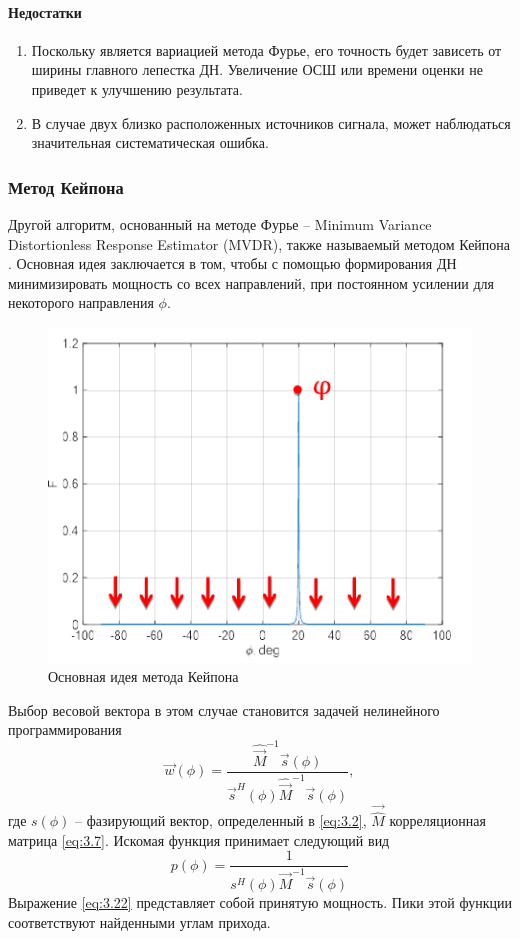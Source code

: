 \paragraph{Недостатки}%
\label{par:nedostatki}
\begin{enumerate}
    \item Поскольку является вариацией метода Фурье, его точность будет зависеть 
    от ширины главного лепестка ДН. Увеличение ОСШ или времени оценки не приведет к улучшению результата. 
    \item В случае двух близко расположенных источников сигнала, может наблюдаться значительная систематическая ошибка. 
\end{enumerate}

\subsubsection{Метод Кейпона}%
\label{sub:minimum_variance_distortionless_response_estimator_capon_method_}

Другой алгоритм, основанный на методе Фурье -- Minimum Variance
Distortionless Response Estimator (MVDR), также называемый методом Кейпона \cite{Stoica2005,Allen2006, Godara2004}. 
Основная идея заключается в том, чтобы с помощью формирования ДН 
минимизировать мощность со всех направлений, при постоянном усилении для некоторого направления $\phi$.

\begin{figure}[h]
    \centering
    \includegraphics[width=0.6\linewidth]{figs/fig3.15.png}
    \caption{Основная идея метода Кейпона}
    \label{fig:3.15}
\end{figure}
Выбор весовой вектора в этом случае становится задачей нелинейного программирования 
\cite{Stoica2005, Godara2004}
\begin{equation}
    \label{eq:3.21}
    \vec w(\phi) = \frac{\hat{\vec M}^{-1} \vec s (\phi)}{\vec s^H(\phi)
        \hat{\vec M}^{-1} \vec s(\phi)},
\end{equation}
где $s(\phi)$ -- фазирующий вектор, определенный в \eqref{eq:3.2}, $\vec{\hat M}$ корреляционная матрица \eqref{eq:3.7}.
Искомая функция принимает следующий вид
\begin{equation}
    \label{eq:3.22}
    p(\phi) = \frac{1}{s^H(\phi) \vec M^{-1} \vec s(\phi)}
\end{equation}
Выражение \eqref{eq:3.22} представляет собой принятую мощность. Пики этой функции соответствуют найденными углам прихода. 
